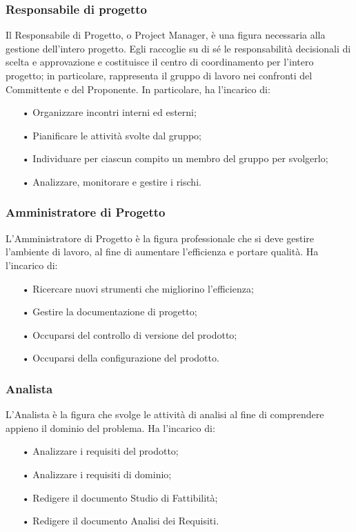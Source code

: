 \subsubsection{Responsabile di progetto}
Il Responsabile di Progetto, o Project Manager, è una figura necessaria alla gestione dell’intero progetto. Egli raccoglie su di sé le responsabilità decisionali di scelta e approvazione e costituisce il centro di coordinamento per l'intero progetto; in particolare, rappresenta il gruppo di lavoro nei confronti del Committente e del Proponente. 
\newline
In particolare, ha l'incarico di:
\begin{itemize}
\item[•] Organizzare incontri interni ed esterni;
\item[•] Pianificare le attività svolte dal gruppo;
\item[•] Individuare per ciascun compito un membro del gruppo per svolgerlo;
\item[•] Analizzare, monitorare e gestire i rischi.
\end{itemize}

\subsubsection{Amministratore di Progetto}
L’Amministratore di Progetto è la figura professionale che si deve gestire l’ambiente di lavoro, al fine di aumentare l’efficienza e portare qualità. 
\newline
Ha l'incarico di:
\begin{itemize}
\item[•] Ricercare nuovi strumenti che migliorino l’efficienza;
\item[•] Gestire la documentazione di progetto;
\item[•] Occuparsi del controllo di versione del prodotto;
\item[•] Occuparsi della configurazione del prodotto.
\end{itemize}

\subsubsection{Analista}
L'Analista è la figura che svolge le attività di analisi al fine di comprendere appieno il dominio del problema.  
\newline
Ha l’incarico di:
\begin{itemize}
\item[•] Analizzare i requisiti del prodotto;
\item[•] Analizzare i requisiti di dominio;
\item[•] Redigere il documento Studio di Fattibilità;
\item[•] Redigere il documento Analisi dei Requisiti.
\end{itemize}

